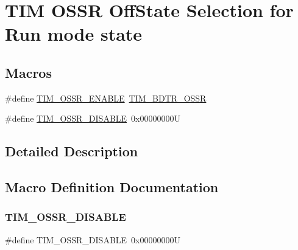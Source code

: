 \hypertarget{group___t_i_m___o_s_s_r___off___state___selection__for___run__mode__state}{}\section{T\+IM O\+S\+SR Off\+State Selection for Run mode state}
\label{group___t_i_m___o_s_s_r___off___state___selection__for___run__mode__state}
\subsection*{Macros}
\begin{DoxyCompactItemize}
\item 
\#define \mbox{\hyperlink{group___t_i_m___o_s_s_r___off___state___selection__for___run__mode__state_ga5d21918f173eca946748a1fbc177daa5}{T\+I\+M\+\_\+\+O\+S\+S\+R\+\_\+\+E\+N\+A\+B\+LE}}~\mbox{\hyperlink{group___peripheral___registers___bits___definition_gaf9435f36d53c6be1107e57ab6a82c16e}{T\+I\+M\+\_\+\+B\+D\+T\+R\+\_\+\+O\+S\+SR}}
\item 
\#define \mbox{\hyperlink{group___t_i_m___o_s_s_r___off___state___selection__for___run__mode__state_gae11820b467ef6d74c90190c8cfce5e73}{T\+I\+M\+\_\+\+O\+S\+S\+R\+\_\+\+D\+I\+S\+A\+B\+LE}}~0x00000000U
\end{DoxyCompactItemize}


\subsection{Detailed Description}


\subsection{Macro Definition Documentation}
\mbox{\label{group___t_i_m___o_s_s_r___off___state___selection__for___run__mode__state_gae11820b467ef6d74c90190c8cfce5e73}} 
\subsubsection{\texorpdfstring{TIM\_OSSR\_DISABLE}{TIM\_OSSR\_DISABLE}}
{\footnotesize\ttfamily \#define T\+I\+M\+\_\+\+O\+S\+S\+R\+\_\+\+D\+I\+S\+A\+B\+LE~0x00000000U}

